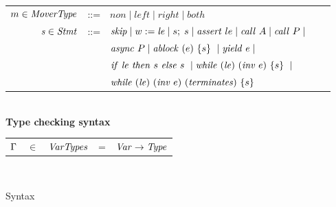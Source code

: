 \begin{figure}
\begin{tabular}{rclcl}
\end{tabular}
\begin{tabular}{rclcl}
$m \in \mathit{MoverType}$ &::= &$\mathit{non} \mid \mathit{left} \mid \mathit{right} \mid \mathit{both}$ \\
$\mathit{s} \in \mathit{Stmt}$ &::= & $\mathit{skip} \mid w := \mathit{le} \mid s;\;s \mid
\mathit{assert}\ le \mid \mathit{call}\ A \mid \mathit{call}\ P \mid $ \\
                  & & $\mathit{async}\ P \mid \mathit{ablock}\ {(e)}\ \{{s}\}\  \mid \mathit{yield}\ e \mid $\\
                  & & ${\mathit{if}\ {\mathit{le}}\ }{\mathit{then}\ {s}\ }{\mathit{else}\ {s}\ } \mid
                  {\mathit{while}\ (\mathit{le})}\ {(\mathit{inv}\ {e})}\ \{{s}\}\  \mid $ \\
                  & & ${\mathit{while}\ (\mathit{le})}\ {(\mathit{inv}\ {e})}\ \mathit{(terminates)}\ \{{s}\}\ $
                  \\ 
\end{tabular}\\
{\bf Type checking syntax} \\
\begin{tabular}{rclcl}
$\Gamma$ & $\in$ & $\mathit{VarTypes}$ & = & $\mathit{Var}\rightarrow\mathit{Type}$ \\
\end{tabular} \\
\setlength{\tabcolsep}{6pt}
\caption{Syntax}
\label{fig:syntax}
\end{figure}



